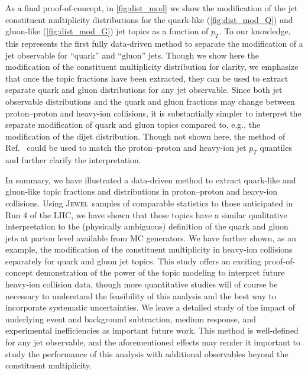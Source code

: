 \documentclass[aps,prl,twocolumn,preprintnumbers,showpacs,floatfix,nofootinbib]{revtex4-1}
\newcommand*{\jewel}{\textsc{Jewel}}
\newcommand{\Refc}[1]{Ref.~\cite{#1}}
\begin{document}
As a final proof-of-concept, in \cref{fig:dist_mod} we show the modification of the jet constituent multiplicity distributions for the quark-like (\cref{fig:dist_mod_Q}) and gluon-like (\cref{fig:dist_mod_G}) jet topics as a function of $p_T$.
%
To our knowledge, this represents the first fully data-driven method to separate the modification of a jet observable for ``quark'' and ``gluon'' jets.
%
Though we show here the modification of the constituent multiplicity distribution for clarity, we emphasize that once the topic fractions have been extracted, they can be used to extract separate quark and gluon distributions for any jet observable.
%
Since both jet observable distributions and the quark and gluon fractions may change between proton--proton and heavy-ion collisions, it is substantially simpler to interpret the separate modification of quark and gluon topics compared to, e.g., the modification of the dijet distribution.
%
Though not shown here, the method of \Refc{Brewer:2018dfs} could be used to match the proton--proton and heavy-ion jet $p_T$ quantiles and further clarify the interpretation.


In summary, we have illustrated a data-driven method to extract quark-like and gluon-like topic fractions and distributions in proton--proton and heavy-ion collisions.
%
Using \jewel\ samples of comparable statistics to those anticipated in Run 4 of the LHC, we have shown that these topics have a similar qualitative interpretation to the (physically ambiguous) definition of the quark and gluon jets at parton level available from MC generators.
%
We have further shown, as an example, the modification of the constituent multiplicity in heavy-ion collisions separately for quark and gluon jet topics.
%
This study offers an exciting proof-of-concept demonstration of the power of the topic modeling to interpret future heavy-ion collision data, though more quantitative studies will of course be necessary to understand the feasibility of this analysis and the best way to incorporate systematic uncertainties.
%
We leave a detailed study of the impact of underlying event and background subtraction, medium response, and experimental inefficiencies as important future work. 
%
This method is well-defined for any jet observable, and the aforementioned effects may render it important to study the performance of this analysis with additional observables beyond the constituent multiplicity.
\end{document}
